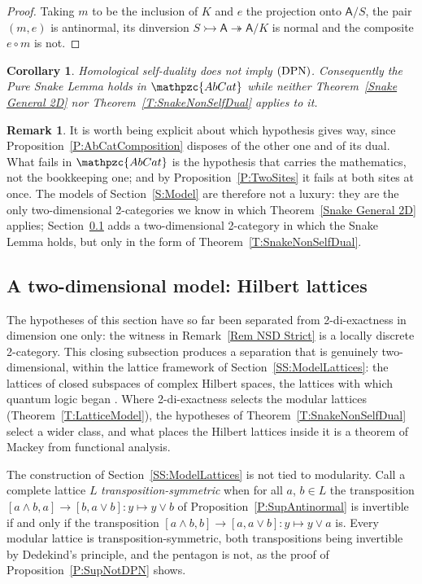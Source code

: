 \documentclass[reqno,a4paper]{amsart}
\numberwithin{equation}{section}
\theoremstyle{plain}
\newtheorem{corollary}[subsection]{Corollary}
\theoremstyle{definition}
\newtheorem{remark}[subsection]{Remark}
\def\nameit#1{\textrm{#1}~}
\def\thex{\nameit{Theorem}}
\def\prox{\nameit{Proposition}}
\def\remx{\nameit{Remark}}
\def\dfn#1{{\itshape #1}}
\newcommand{\comp}{\circ}
\newcommand{\catfont}[1]{\ensuremath{\mathpzc{#1}}\xspace}
\newcommand{\onecat}[1]{\ensuremath{\mathsf{#1}}\xspace}
\newcommand{\AbCat}{\catfont{AbCat}}
\renewcommand{\1}{\onecat{1}}
\newcommand{\DPN}{\textup{(DPN)}}
\begin{document}
\begin{proof}
	Taking \(m\) to be the inclusion of \(K\) and \(e\) the projection onto \(\onecat{A}/S\), the pair \((m,e)\) is antinormal, its dinversion \(S\rightarrowtail\onecat{A}\twoheadrightarrow\onecat{A}/K\) is normal and the composite \(e\comp m\) is not.
\end{proof}

\begin{corollary}\label{C:HSDstrict}
	Homological self-duality does not imply \(\DPN\). Consequently the Pure Snake Lemma holds in \(\AbCat\) while neither \thex\ref{Snake General 2D} nor \thex\ref{T:SnakeNonSelfDual} applies to it.
\end{corollary}

\begin{remark}\label{Rem NSD AbCatWhich}
	It is worth being explicit about which hypothesis gives way, since \prox\ref{P:AbCatComposition} disposes of the other one and of its dual. What fails in \(\AbCat\) is the hypothesis that carries the mathematics, not the bookkeeping one; and by \prox\ref{P:TwoSites} it fails at both sites at once. The models of Section~\ref{S:Model} are therefore not a luxury: they are the only two-dimensional 2-categories we know in which \thex\ref{Snake General 2D} applies; Section~\ref{SS:NSDHilbert} adds a two-dimensional 2-category in which the Snake Lemma holds, but only in the form of \thex\ref{T:SnakeNonSelfDual}.
\end{remark}

\subsection{A two-dimensional model: Hilbert lattices}\label{SS:NSDHilbert}

The hypotheses of this section have so far been separated from 2-di-exactness in dimension one only: the witness in \remx\ref{Rem NSD Strict} is a locally discrete 2-category. This closing subsection produces a separation that is genuinely two-dimensional, within the lattice framework of Section~\ref{SS:ModelLattices}: the lattices of closed subspaces of complex Hilbert spaces, the lattices with which quantum logic began \cite{BirVNeu36}. Where 2-di-exactness selects the modular lattices (\thex\ref{T:LatticeModel}), the hypotheses of \thex\ref{T:SnakeNonSelfDual} select a wider class, and what places the Hilbert lattices inside it is a theorem of Mackey from functional analysis.

The construction of Section~\ref{SS:ModelLattices} is not tied to modularity. Call a complete lattice \(L\) \dfn{transposition-symmetric} when for all \(a\), \(b\in L\) the transposition \([a\wedge b,a]\to[b,a\vee b]\colon y\mapsto y\vee b\) of \prox\ref{P:SupAntinormal} is invertible if and only if the transposition \([a\wedge b,b]\to[a,a\vee b]\colon y\mapsto y\vee a\) is. Every modular lattice is transposition-symmetric, both transpositions being invertible by Dedekind's principle, and the pentagon is not, as the proof of \prox\ref{P:SupNotDPN} shows.
\end{document}
